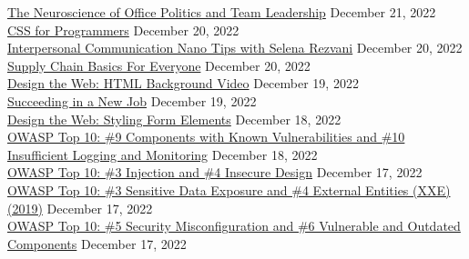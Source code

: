 \documentclass[10pt]{res} %
\begin{document}
\begin{resume}
\href{https://www.linkedin.com/learning/certificates/32ae53b3b5d92f08bdddcaafb4c1cec7c3c13a115e5c8a5bf27e9c6061e006b9}{\color{blue}The Neuroscience of Office Politics and Team Leadership} \hfill December 21, 2022 \\
\href{https://www.linkedin.com/learning/certificates/7fc451f9549c88a3fee4f3d15ecd247c5be36735c7444f277eecc64854681b14}{\color{blue}CSS for Programmers} \hfill December 20, 2022 \\
\href{https://www.linkedin.com/learning/certificates/cfc849049c3ef8d8bc14bb9c8a4eefb8e81210cf30f1329208e48f0c88995d58}{\color{blue}Interpersonal Communication Nano Tips with Selena Rezvani} \hfill December 20, 2022 \\
\href{https://www.linkedin.com/learning/certificates/6675da91d6c5491ae23f9efcac731de90ca5caf4343140f79eb281e592bcb096}{\color{blue}Supply Chain Basics For Everyone} \hfill December 20, 2022 \\
\href{https://www.linkedin.com/learning/certificates/8b43323dd56b578635e6976cc7d49e508b70deca61cc8e75dbd1542192d0bce4}{\color{blue}Design the Web: HTML Background Video} \hfill December 19, 2022 \\
\href{https://www.linkedin.com/learning/certificates/6b8b6c7941ae84d4301ada21eeb44db750979e8c77ddba3c81d7c77299ca5c29}{\color{blue}Succeeding in a New Job} \hfill December 19, 2022 \\
\href{https://www.linkedin.com/learning/certificates/d03ad4e579e5d2da476aa807e8b459d73a3a05d35cfe7f760259f6063be0cfe0}{\color{blue}Design the Web: Styling Form Elements} \hfill December 18, 2022 \\
\href{https://www.linkedin.com/learning/certificates/a2535847501e40d9c9ffc824b1829f773810821e97ec31388bed9d8504e1bfdf}{\color{blue}OWASP Top 10: \#9 Components with Known Vulnerabilities and \#10 Insufficient Logging and Monitoring} \hfill December 18, 2022 \\
\href{https://www.linkedin.com/learning/certificates/80ee198202c97403457c083fc796e8a935ebd3ec9984326604f201b624a4c1a9}{\color{blue}OWASP Top 10: \#3 Injection and \#4 Insecure Design} \hfill December 17, 2022 \\
\href{https://www.linkedin.com/learning/certificates/6b9b746bb4281e320edceab625233c59f43f9417c916bf03c04abcfc64d58af1}{\color{blue}OWASP Top 10: \#3 Sensitive Data Exposure and \#4 External Entities (XXE) (2019)} \hfill December 17, 2022 \\
\href{https://www.linkedin.com/learning/certificates/ac8a6c5f73605b570bbad8fe06e290d0abed802b9082b0efea83c493f895656b}{\color{blue}OWASP Top 10: \#5 Security Misconfiguration and \#6 Vulnerable and Outdated Components} \hfill December 17, 2022 \\

\end{resume}
\end{document}
